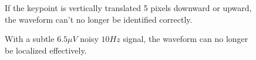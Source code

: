 \begin{figure}[h!]
\centering
{}
\caption[Waveform identification under patch vertical translations]{If the keypoint is vertically translated 5 pixels downward or upward, the waveform can't no longer be identified correctly.}
\label{fig:dialdescriptors5}
\end{figure}




\begin{figure}[h!]
\centering
{}
\caption[Waveform identification under the presence of a noisy $\alpha$-wave.]{With a subtle $6.5 \mu V$ noisy $10 \si{Hz}$ signal, the waveform can no longer be localized effectively.}
\label{fig:dialdescriptors7}
\end{figure}

